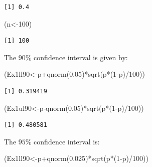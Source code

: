 \documentclass[
  letterpaper,
  DIV=11,
  numbers=noendperiod]{scrreprt}
\newenvironment{Shaded}{\begin{snugshade}}{\end{snugshade}}
\newcommand{\DecValTok}[1]{\textcolor[rgb]{0.68,0.00,0.00}{#1}}
\newcommand{\FloatTok}[1]{\textcolor[rgb]{0.68,0.00,0.00}{#1}}
\newcommand{\FunctionTok}[1]{\textcolor[rgb]{0.28,0.35,0.67}{#1}}
\newcommand{\NormalTok}[1]{\textcolor[rgb]{0.00,0.23,0.31}{#1}}
\newcommand{\OtherTok}[1]{\textcolor[rgb]{0.00,0.23,0.31}{#1}}
\newcommand{\SpecialCharTok}[1]{\textcolor[rgb]{0.37,0.37,0.37}{#1}}
\begin{document}
\begin{verbatim}
[1] 0.4
\end{verbatim}

\begin{Shaded}
\begin{Highlighting}[numbers=left,,]
\NormalTok{(n}\OtherTok{\textless{}{-}}\DecValTok{100}\NormalTok{)}
\end{Highlighting}
\end{Shaded}

\begin{verbatim}
[1] 100
\end{verbatim}

The \(90\)\% confidence interval is given by:

\begin{Shaded}
\begin{Highlighting}[numbers=left,,]
\NormalTok{(Ex1ll90}\OtherTok{\textless{}{-}}\NormalTok{p}\SpecialCharTok{+}\FunctionTok{qnorm}\NormalTok{(}\FloatTok{0.05}\NormalTok{)}\SpecialCharTok{*}\FunctionTok{sqrt}\NormalTok{(p}\SpecialCharTok{*}\NormalTok{(}\DecValTok{1}\SpecialCharTok{{-}}\NormalTok{p)}\SpecialCharTok{/}\DecValTok{100}\NormalTok{))}
\end{Highlighting}
\end{Shaded}

\begin{verbatim}
[1] 0.319419
\end{verbatim}

\begin{Shaded}
\begin{Highlighting}[numbers=left,,]
\NormalTok{(Ex1ul90}\OtherTok{\textless{}{-}}\NormalTok{p}\SpecialCharTok{{-}}\FunctionTok{qnorm}\NormalTok{(}\FloatTok{0.05}\NormalTok{)}\SpecialCharTok{*}\FunctionTok{sqrt}\NormalTok{(p}\SpecialCharTok{*}\NormalTok{(}\DecValTok{1}\SpecialCharTok{{-}}\NormalTok{p)}\SpecialCharTok{/}\DecValTok{100}\NormalTok{))}
\end{Highlighting}
\end{Shaded}

\begin{verbatim}
[1] 0.480581
\end{verbatim}

The \(95\)\% confidence interval is:

\begin{Shaded}
\begin{Highlighting}[numbers=left,,]
\NormalTok{(Ex1ll90}\OtherTok{\textless{}{-}}\NormalTok{p}\SpecialCharTok{+}\FunctionTok{qnorm}\NormalTok{(}\FloatTok{0.025}\NormalTok{)}\SpecialCharTok{*}\FunctionTok{sqrt}\NormalTok{(p}\SpecialCharTok{*}\NormalTok{(}\DecValTok{1}\SpecialCharTok{{-}}\NormalTok{p)}\SpecialCharTok{/}\DecValTok{100}\NormalTok{))}
\end{Highlighting}
\end{Shaded}
\end{document}
